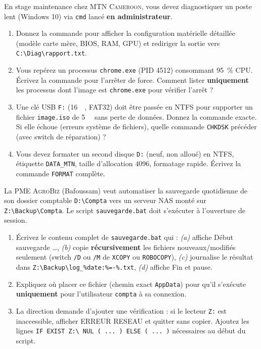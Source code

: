 \documentclass[11pt]{article}
\begin{document}
\begin{exercice}
\label{exo:admin_proc}
En stage maintenance chez \textsc{MTN Cameroon}, vous devez diagnostiquer un poste lent (Windows 10) via \texttt{cmd} lancé \textbf{en administrateur}.
\begin{enumerate}
    \item [1 pt] Donnez la commande pour afficher la configuration matérielle détaillée (modèle carte mère, BIOS, RAM, GPU) et rediriger la sortie vers \texttt{C:\textbackslash{}Diag\textbackslash{}rapport.txt}.
    \item [2 pts] Vous repérez un processus \texttt{chrome.exe} (PID \num{4512}) consommant \SI{95}{\percent} CPU. Écrivez la commande pour l'arrêter de force. Comment lister \textbf{uniquement} les processus dont l'image est \texttt{chrome.exe} pour vérifier l'arrêt ?
    \item [2 pts] Une clé USB \texttt{F:} (\SI{16}{\giga\byte}, FAT32) doit être passée en NTFS pour supporter un fichier \texttt{image.iso} de \SI{5}{\giga\byte} sans perte de données. Donnez la commande exacte. Si elle échoue (erreurs système de fichiers), quelle commande \texttt{CHKDSK} précéder (avec switch de réparation) ?
    \item [1 pt] Vous devez formater un second disque \texttt{D:} (neuf, non alloué) en NTFS, étiquette \texttt{DATA\_MTN}, taille d'allocation \SI{4096}{\byte}, formatage rapide. Écrivez la commande \texttt{FORMAT} complète.
\end{enumerate}
\end{exercice}

\begin{exercice}
\label{exo:bat}
La PME \og \textsc{AgroBiz} \fg{} (Bafoussam) veut automatiser la sauvegarde quotidienne de son dossier comptable \texttt{D:\textbackslash{}Compta} vers un serveur NAS monté sur \texttt{Z:\textbackslash{}Backup\textbackslash{}Compta}. Le script \texttt{sauvegarde.bat} doit s'exécuter à l'ouverture de session.
\begin{enumerate}
    \item [2 pts] Écrivez le contenu complet de \texttt{sauvegarde.bat} qui : \textit{(a)} affiche \og Début sauvegarde \dots \fg{}, \textit{(b)} copie \textbf{récursivement} les fichiers nouveaux/modifiés seulement (switch \texttt{/D} ou \texttt{/M} de \texttt{XCOPY} ou \texttt{ROBOCOPY}), \textit{(c)} journalise le résultat dans \texttt{Z:\textbackslash{}Backup\textbackslash{}log\_\%date:\%=-\%.txt}, \textit{(d)} affiche \og Fin \fg{} et pause.
    \item [1 pt] Expliquez où placer ce fichier (chemin exact \texttt{AppData}) pour qu'il s'exécute \textbf{uniquement} pour l'utilisateur \texttt{compta} à sa connexion.
    \item [1 pt] La direction demande d'ajouter une vérification : si le lecteur \texttt{Z:} est inaccessible, afficher \og ERREUR RESEAU \fg{} et quitter sans copier. Ajoutez les lignes \texttt{IF EXIST Z:\textbackslash{} NUL ( ... ) ELSE ( ... )} nécessaires au début du script.
\end{enumerate}
\end{exercice}
\end{document}
